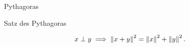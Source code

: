\documentclass[class=article, crop=false]{standalone}
\begin{document}
\begin{zettel}{Pythagoras}
\begin{flashcard}[roiqpx39]{Satz des Pythagoras}
	\begin{theorem}
		\[
			x \perp y \implies \left\|x+y\right\|^2 = \left\|x\right\|^2 + \left\|y\right\|^2
		.\]
	\end{theorem}
\end{flashcard}
\end{zettel}
\end{document}
